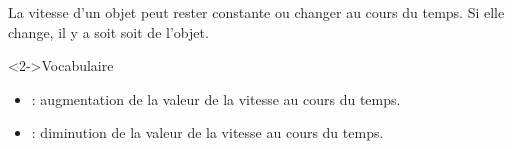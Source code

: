 \documentclass[xcolor={dvipsnames}]{beamer}
\begin{document}
\begin{frame}
\begin{alertblock}{}
	La vitesse d'un objet peut rester constante ou changer au cours du temps.
	Si elle change, il y a soit  soit  de l'objet. 
	
\end{alertblock}


\begin{block}<2->{\Large{Vocabulaire}}
	\begin{itemize}
		\item {} : \pause  augmentation de la valeur de la vitesse au cours du temps.\pause
		
		\item {} : \pause diminution de la valeur de la vitesse au cours du temps.
	\end{itemize}
\end{block}
		
\end{frame}
\end{document}
